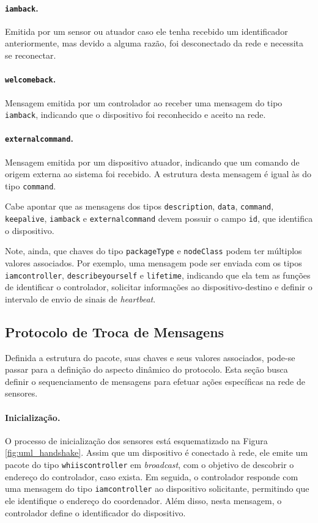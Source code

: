 \paragraph*{\texttt{iamback}.} Emitida por um sensor ou atuador caso ele tenha recebido um identificador anteriormente, mas devido a alguma razão, foi desconectado da rede e necessita se reconectar.

\paragraph*{\texttt{welcomeback}.} Mensagem emitida por um controlador ao receber uma mensagem do tipo \texttt{iamback}, indicando que o dispositivo foi reconhecido e aceito na rede.

\paragraph*{\texttt{externalcommand}.} Mensagem emitida por um dispositivo atuador, indicando que um comando de origem externa ao sistema foi recebido. A estrutura desta mensagem é igual às do tipo \texttt{command}.

Cabe apontar que as mensagens dos tipos \texttt{description}, \texttt{data}, \texttt{command}, \texttt{keepalive}, \texttt{iamback} e \texttt{externalcommand} devem possuir o campo \texttt{id}, que identifica o dispositivo.

Note, ainda, que chaves do tipo \texttt{packageType} e \texttt{nodeClass} podem ter múltiplos valores associados. Por exemplo, uma mensagem pode ser enviada com os tipos \texttt{iamcontroller}, \texttt{describeyourself} e \texttt{lifetime}, indicando que ela tem as funções de identificar o controlador, solicitar informações ao dispositivo-destino e definir o intervalo de envio de sinais de \textit{heartbeat}.

\subsection{Protocolo de Troca de Mensagens}
Definida a estrutura do pacote, suas chaves e seus valores associados, pode-se passar para a definição do aspecto dinâmico do protocolo. Esta seção busca definir o sequenciamento de mensagens para efetuar ações específicas na rede de sensores.

\paragraph*{Inicialização.} O processo de inicialização dos sensores está esquematizado na Figura \ref{fig:uml_handshake}. Assim que um dispositivo é conectado à rede, ele emite um pacote do tipo \texttt{whiiscontroller} em \textit{broadcast}, com o objetivo de descobrir o endereço do controlador, caso exista. Em seguida, o controlador responde com uma mensagem do tipo \texttt{iamcontroller} ao dispositivo solicitante, permitindo que ele identifique o endereço do coordenador. Além disso, nesta mensagem, o controlador define o identificador do dispositivo.

